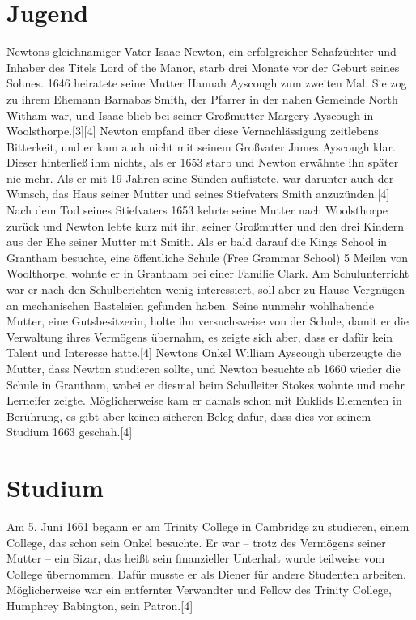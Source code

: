\section{Jugend}
Newtons gleichnamiger Vater Isaac Newton, ein erfolgreicher Schafzüchter und Inhaber des Titels Lord of the Manor, starb drei Monate vor der Geburt seines Sohnes. 1646 heiratete seine Mutter Hannah Ayscough zum zweiten Mal. Sie zog zu ihrem Ehemann Barnabas Smith, der Pfarrer in der nahen Gemeinde North Witham war, und Isaac blieb bei seiner Großmutter Margery Ayscough in Woolsthorpe.[3][4] Newton empfand über diese Vernachlässigung zeitlebens Bitterkeit, und er kam auch nicht mit seinem Großvater James Ayscough klar. Dieser hinterließ ihm nichts, als er 1653 starb und Newton erwähnte ihn später nie mehr. Als er mit 19 Jahren seine Sünden auflistete, war darunter auch der Wunsch, das Haus seiner Mutter und seines Stiefvaters Smith anzuzünden.[4] Nach dem Tod seines Stiefvaters 1653 kehrte seine Mutter nach Woolsthorpe zurück und Newton lebte kurz mit ihr, seiner Großmutter und den drei Kindern aus der Ehe seiner Mutter mit Smith. Als er bald darauf die Kings School in Grantham besuchte, eine öffentliche Schule (Free Grammar School) 5 Meilen von Woolthorpe, wohnte er in Grantham bei einer Familie Clark. Am Schulunterricht war er nach den Schulberichten wenig interessiert, soll aber zu Hause Vergnügen an mechanischen Basteleien gefunden haben. Seine nunmehr wohlhabende Mutter, eine Gutsbesitzerin, holte ihn versuchsweise von der Schule, damit er die Verwaltung ihres Vermögens übernahm, es zeigte sich aber, dass er dafür kein Talent und Interesse hatte.[4] Newtons Onkel William Ayscough überzeugte die Mutter, dass Newton studieren sollte, und Newton besuchte ab 1660 wieder die Schule in Grantham, wobei er diesmal beim Schulleiter Stokes wohnte und mehr Lerneifer zeigte. Möglicherweise kam er damals schon mit Euklids Elementen in Berührung, es gibt aber keinen sicheren Beleg dafür, dass dies vor seinem Studium 1663 geschah.[4]




\section{Studium}
Am 5. Juni 1661 begann er am Trinity College in Cambridge zu studieren, einem College, das schon sein Onkel besuchte. Er war – trotz des Vermögens seiner Mutter – ein Sizar, das heißt sein finanzieller Unterhalt wurde teilweise vom College übernommen. Dafür musste er als Diener für andere Studenten arbeiten. Möglicherweise war ein entfernter Verwandter und Fellow des Trinity College, Humphrey Babington, sein Patron.[4]

